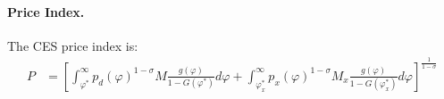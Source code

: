 \begin{solution}
	\paragraph{Price Index.} The CES price index is:
	\begin{align*}
		P &= \left[ \int_{\varphi^*}^{\infty} p_d(\varphi)^{1 - \sigma} M\frac{g(\varphi)}{1 - G(\varphi^*)} d\varphi + \int_{\varphi_x^*}^{\infty} p_x(\varphi)^{1 - \sigma} M_x\frac{g(\varphi)}{1 - G(\varphi_x^*)} d\varphi \right]^{\frac{1}{1 - \sigma}} \\
		\end{align*}
	\end{solution}